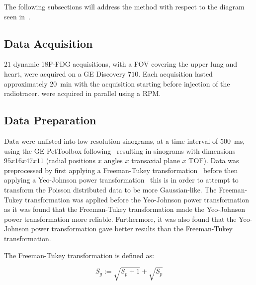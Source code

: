             The following subsections will address the method with respect to the diagram seen in~.
            
            \subsection{Data Acquisition} \label{sec:pca_data_driven_surrogate_signal_extraction_methods_for_dynamic_pet_methods_data_acquisition}
                $21$ dynamic \gls{18F-FDG} acquisitions, with a \gls{FOV} covering the upper lung and heart, were acquired on a \gls{GE} Discovery $710$. Each acquisition lasted approximately \SI{20}{\minute} with the acquisition starting before injection of the radiotracer.  were acquired in parallel using a \gls{RPM}.
                
            \subsection{Data Preparation} \label{sec:pca_data_driven_surrogate_signal_extraction_methods_for_dynamic_pet_methods_data_preparation}
                Data were unlisted into low resolution sinograms, at a time interval of \SI{500}{\milli\second}, using the \gls{GE} PetToolbox following~ resulting in sinograms with dimensions $95 x 16 x 47 x 11$ (radial positions $x$ angles $x$ transaxial plane $x$ \gls{TOF}). Data was preprocessed by first applying a Freeman-Tukey transformation~ before then applying a Yeo-Johnson power transformation~ this is in order to attempt to transform the Poisson distributed data to be more Gaussian-like. The Freeman-Tukey transformation was applied before the Yeo-Johnson power transformation as it was found that the Freeman-Tukey transformation made the Yeo-Johnson power transformation more reliable. Furthermore, it was also found that the Yeo-Johnson power transformation gave better results than the Freeman-Tukey transformation.
                
                The Freeman-Tukey transformation is defined as:

                \begin{equation} \label{eq:pca_data_driven_surrogate_signal_extraction_methods_for_dynamic_pet_methods_freeman_tukey}
                    S_g := \sqrt{S_p + 1} + \sqrt{S_p}
                \end{equation}

